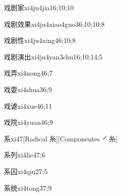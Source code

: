 \begin{verbete}{戏剧家}{xi4ju4jia1}{6;10;10}
\end{verbete}

\begin{verbete}{戏剧效果}{xi4ju4xiao4guo3}{6;10;10;8}
\end{verbete}

\begin{verbete}{戏剧性}{xi4ju4xing4}{6;10;8}
\end{verbete}

\begin{verbete}{戏剧演出}{xi4ju4yan3chu1}{6;10;14;5}
\end{verbete}

\begin{verbete}{戏弄}{xi4nong4}{6;7}
\end{verbete}

\begin{verbete}{戏耍}{xi4shua3}{6;9}
\end{verbete}

\begin{verbete}{戏谑}{xi4xue4}{6;11}
\end{verbete}

\begin{verbete}{戏院}{xi4yuan4}{6;9}
\end{verbete}

\begin{verbete}{系}{xi4}{7}[Radical 糸][Componentes ㇒糸]
\end{verbete}

\begin{verbete}{系列}{xi4lie4}{7;6}
\end{verbete}

\begin{verbete}{系囚}{xi4qiu2}{7;5}
\end{verbete}

\begin{verbete}{系统}{xi4tong3}{7;9}
\end{verbete}

